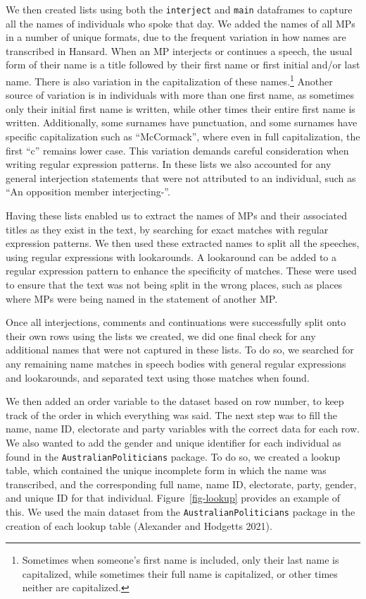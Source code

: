 \documentclass[
  letterpaper,
  DIV=11,
  numbers=noendperiod]{scrartcl}
\begin{document}
We then created lists using both the \texttt{interject} and
\texttt{main} dataframes to capture all the names of individuals who
spoke that day. We added the names of all MPs in a number of unique
formats, due to the frequent variation in how names are transcribed in
Hansard. When an MP interjects or continues a speech, the usual form of
their name is a title followed by their first name or first initial
and/or last name. There is also variation in the capitalization of these
names.\footnote{Sometimes when someone's first name is included, only
  their last name is capitalized, while sometimes their full name is
  capitalized, or other times neither are capitalized.} Another source
of variation is in individuals with more than one first name, as
sometimes only their initial first name is written, while other times
their entire first name is written. Additionally, some surnames have
punctuation, and some surnames have specific capitalization such as
``McCormack'', where even in full capitalization, the first ``c''
remains lower case. This variation demands careful consideration when
writing regular expression patterns. In these lists we also accounted
for any general interjection statements that were not attributed to an
individual, such as ``An opposition member interjecting-''.

Having these lists enabled us to extract the names of MPs and their
associated titles as they exist in the text, by searching for exact
matches with regular expression patterns. We then used these extracted
names to split all the speeches, using regular expressions with
lookarounds. A lookaround can be added to a regular expression pattern
to enhance the specificity of matches. These were used to ensure that
the text was not being split in the wrong places, such as places where
MPs were being named in the statement of another MP.

Once all interjections, comments and continuations were successfully
split onto their own rows using the lists we created, we did one final
check for any additional names that were not captured in these lists. To
do so, we searched for any remaining name matches in speech bodies with
general regular expressions and lookarounds, and separated text using
those matches when found.

We then added an order variable to the dataset based on row number, to
keep track of the order in which everything was said. The next step was
to fill the name, name ID, electorate and party variables with the
correct data for each row. We also wanted to add the gender and unique
identifier for each individual as found in the
\texttt{AustralianPoliticians} package. To do so, we created a lookup
table, which contained the unique incomplete form in which the name was
transcribed, and the corresponding full name, name ID, electorate,
party, gender, and unique ID for that individual.
Figure~\ref{fig-lookup} provides an example of this. We used the main
dataset from the \texttt{AustralianPoliticians} package in the creation
of each lookup table (Alexander and Hodgetts 2021).
\end{document}
